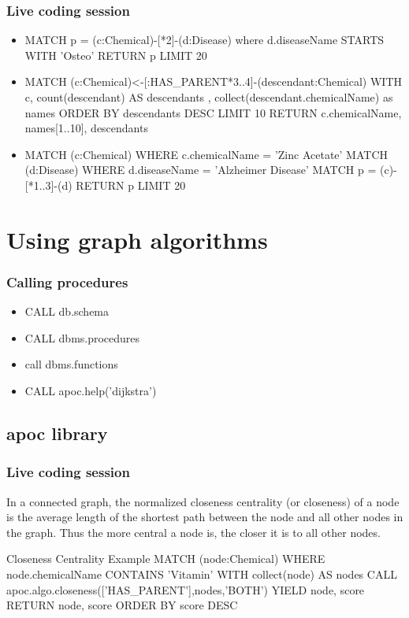 \documentclass[12pt]{beamer}
\begin{document}
    \begin{frame}
        \frametitle{Live coding session}
        \begin{itemize}
            \item MATCH p = (c:Chemical)-[*2]-(d:Disease) where d.diseaseName STARTS WITH 'Osteo' RETURN p LIMIT 20
            \item MATCH (c:Chemical)<-[:HAS\_PARENT*3..4]-(descendant:Chemical) 
            WITH c, count(descendant) AS descendants , collect(descendant.chemicalName) as names ORDER BY descendants DESC LIMIT 10
            RETURN c.chemicalName, names[1..10], descendants
            \item MATCH (c:Chemical) WHERE c.chemicalName = 'Zinc Acetate'
            MATCH (d:Disease) WHERE d.diseaseName = 'Alzheimer Disease' 
            MATCH p = (c)-[*1..3]-(d)
            RETURN p LIMIT 20
        \end{itemize}
    \end{frame}
    
    \section{Using graph algorithms}
    \begin{frame}
        \frametitle{Calling procedures}
        \begin{itemize}
            \item CALL db.schema
            \item CALL dbms.procedures
            \item call dbms.functions
            \item CALL apoc.help('dijkstra')
        \end{itemize}
    \end{frame}
    
    \subsection{apoc library}
    \begin{frame}
        \frametitle{Live coding session}
        \begin{Definition}
            In a connected graph, the normalized closeness centrality (or closeness) of a node is the average length of the shortest path between the node and all other nodes in the graph. Thus the more central a node is, the closer it is to all other nodes.\footnotemark
        \end{Definition}
        \begin{block}{Closeness Centrality Example}
            MATCH (node:Chemical)
            WHERE node.chemicalName CONTAINS 'Vitamin'
            WITH collect(node) AS nodes
            CALL apoc.algo.closeness(['HAS\_PARENT'],nodes,'BOTH') YIELD node, score
            RETURN node, score
            ORDER BY score DESC
        \end{block}
    \end{frame}
    
\end{document}
